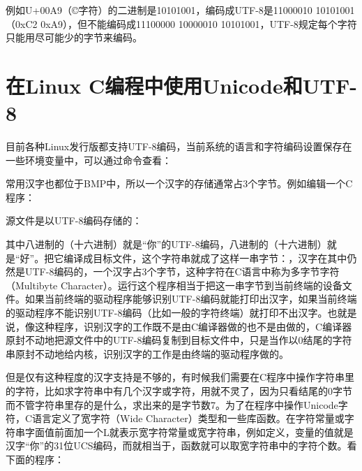 例如U+\BookSplit{}00A9（©字符）的二进制是10101001，编码成UTF-8是11000010 10101001（0xC2 0xA9），但不能编码成11100000 10000010 10101001，UTF-8规定每个字符只能用尽可能少的字节来编码。




\section{在Linux C编程中使用Unicode和UTF-8}
%
目前各种Linux发行版都支持UTF-8编码，当前系统的语言和字符编码设置保存在一些环境变量中，可以通过命令查看：




常用汉字也都位于BMP中，所以一个汉字的存储通常占3个字节。例如编辑一个C程序：




源文件是以UTF-8编码存储的：




其中八进制的（十六进制）就是“你”的UTF-8编码，八进制的（十六进制）就是“好”。把它编译成目标文件，这个字符串就成了这样一串字节：，汉字在其中仍然是UTF-8编码的，一个汉字占3个字节，这种字符在C语言中称为多字节字符（Multibyte Character）。运行这个程序相当于把这一串字节到当前终端的设备文件。如果当前终端的驱动程序能够识别UTF-8编码就能打印出汉字，如果当前终端的驱动程序不能识别UTF-8编码（比如一般的字符终端）就打印不出汉字。也就是说，像这种程序，识别汉字的工作既不是由C编译器做的也不是由做的，C编译器原封不动地把源文件中的UTF-8编码复制到目标文件中，只是当作以0结尾的字符串原封不动地给内核，识别汉字的工作是由终端的驱动程序做的。



但是仅有这种程度的汉字支持是不够的，有时候我们需要在C程序中操作字符串里的字符，比如求字符串中有几个汉字或字符，用就不灵了，因为只看结尾的0字节而不管字符串里存的是什么，求出来的是字节数7。为了在程序中操作Unicode字符，C语言定义了宽字符（Wide Character）类型和一些库函数。在字符常量或字符串字面值前面加一个L就表示宽字符常量或宽字符串，例如定义，变量的值就是汉字“你”的31位UCS编码，而就相当于，函数就可以取宽字符串中的字符个数。看下面的程序：


